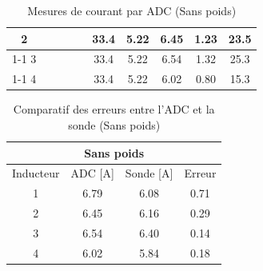 \begin{table}[H]
{\begin{tabular}{|c|c|c|c|c|c|c|c|c|c|}
            2         &                                                            &                           &                                                         &                                                          & 33.4                                                    & 5.22                                                                & 6.45                                                  & 1.23   & 23.5                                                               \\ \cline{1-1} \cline{6-10}
            3         &                                                            &                           &                                                         &                                                          & 33.4                                                    & 5.22                                                                & 6.54                                                  & 1.32   & 25.3                                                               \\ \cline{1-1} \cline{6-10}
            4         &                                                            &                           &                                                         &                                                          & 33.4                                                    & 5.22                                                                & 6.02                                                  & 0.80   & 15.3                                                               \\ \hline
        \end{tabular}%
    }
    \caption{Mesures de courant par ADC (Sans poids)}
    \label{tab:sans_poids_adc}
\end{table}

\begin{table}[H]
    \centering
    \begin{tabular}{|c|c|c|c|}
        \hline
        \multicolumn{4}{|c|}{\textbf{Sans poids}}        \\ \hline
        Inducteur & ADC {[}A{]} & Sonde {[}A{]} & Erreur \\ \hline
        1         & 6.79        & 6.08          & 0.71   \\ \hline
        2         & 6.45        & 6.16          & 0.29   \\ \hline
        3         & 6.54        & 6.40          & 0.14   \\ \hline
        4         & 6.02        & 5.84          & 0.18   \\ \hline
    \end{tabular}
    \caption{Comparatif des erreurs entre l'ADC et la sonde (Sans poids)}
    \label{tab:sans_poids_comp}
\end{table}

